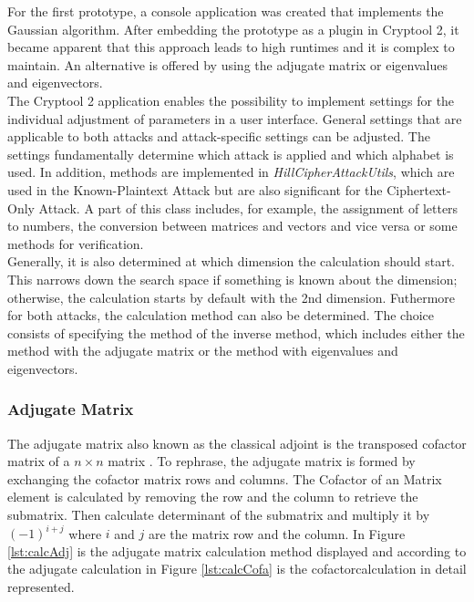 \documentclass[conference]{IEEEtran}
\begin{document}
For the first prototype, a console application was created that implements the Gaussian algorithm. After embedding the prototype as a plugin in Cryptool 2, it became apparent that this approach leads to high runtimes and it is complex to maintain. An alternative is offered by using the adjugate matrix or eigenvalues and eigenvectors.
\\
The Cryptool 2 application enables the possibility to implement settings for the individual adjustment of parameters in a user interface. General settings that are applicable to both attacks and attack-specific settings can be adjusted. The settings fundamentally determine which attack is  applied and which alphabet is used. In addition, methods are implemented in \textit{HillCipherAttackUtils}, which are used in the Known-Plaintext Attack but are also significant for the Ciphertext-Only Attack. A part of this class includes, for example, the assignment of letters to numbers, the conversion between matrices and vectors and vice versa or some methods for verification.
\\
Generally, it is also determined at which dimension the calculation should start. This narrows down the search space if something is known about the dimension; otherwise, the calculation starts by default with the 2nd dimension.
Futhermore for both attacks, the calculation method can also be determined. The choice consists of specifying the method of the inverse method, which includes either the method with the adjugate matrix or the method with eigenvalues and eigenvectors.
\\

\subsubsection{Adjugate Matrix}

The adjugate matrix also known as the classical adjoint is the transposed cofactor matrix of a \( n \times n \) matrix \cite{b4}. To rephrase, the adjugate matrix is formed by exchanging the cofactor matrix rows and columns.
The Cofactor of an Matrix element is calculated by removing the row and the column to retrieve the submatrix. Then calculate determinant of the submatrix and multiply it by \((-1)^{i+j}\) where \(i\) and \(j\) are the matrix row and the column. 
In Figure \ref{lst:calcAdj} is the adjugate matrix calculation method displayed and according to the adjugate calculation in Figure \ref{lst:calcCofa} is the cofactorcalculation in detail represented.
\\
\end{document}

